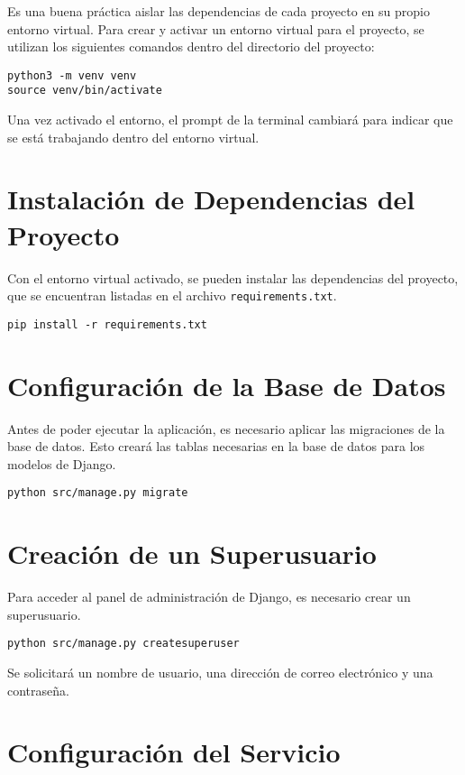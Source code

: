 Es una buena práctica aislar las dependencias de cada proyecto en su propio entorno virtual. Para crear y activar un entorno virtual para el proyecto, se utilizan los siguientes comandos dentro del directorio del proyecto:

\begin{verbatim}
python3 -m venv venv
source venv/bin/activate
\end{verbatim}

Una vez activado el entorno, el prompt de la terminal cambiará para indicar que se está trabajando dentro del entorno virtual.

\section{Instalación de Dependencias del Proyecto}

Con el entorno virtual activado, se pueden instalar las dependencias del proyecto, que se encuentran listadas en el archivo \texttt{requirements.txt}.

\begin{verbatim}
pip install -r requirements.txt
\end{verbatim}

\section{Configuración de la Base de Datos}

Antes de poder ejecutar la aplicación, es necesario aplicar las migraciones de la base de datos. Esto creará las tablas necesarias en la base de datos para los modelos de Django.

\begin{verbatim}
python src/manage.py migrate
\end{verbatim}

\section{Creación de un Superusuario}

Para acceder al panel de administración de Django, es necesario crear un superusuario.

\begin{verbatim}
python src/manage.py createsuperuser
\end{verbatim}

Se solicitará un nombre de usuario, una dirección de correo electrónico y una contraseña.

\section{Configuración del Servicio}

